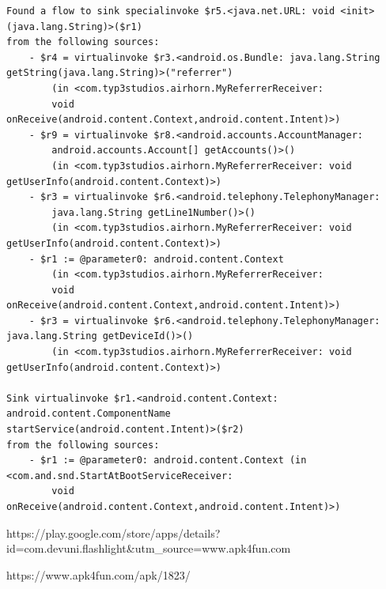 \documentclass[10pt,a4paper]{article}
\begin{document}
\begin{verbatim}
Found a flow to sink specialinvoke $r5.<java.net.URL: void <init>(java.lang.String)>($r1)
from the following sources:
	- $r4 = virtualinvoke $r3.<android.os.Bundle: java.lang.String getString(java.lang.String)>("referrer") 
        (in <com.typ3studios.airhorn.MyReferrerReceiver: 
        void onReceive(android.content.Context,android.content.Intent)>)
	- $r9 = virtualinvoke $r8.<android.accounts.AccountManager: 
        android.accounts.Account[] getAccounts()>() 
        (in <com.typ3studios.airhorn.MyReferrerReceiver: void getUserInfo(android.content.Context)>)
	- $r3 = virtualinvoke $r6.<android.telephony.TelephonyManager: 
        java.lang.String getLine1Number()>() 
        (in <com.typ3studios.airhorn.MyReferrerReceiver: void getUserInfo(android.content.Context)>)
	- $r1 := @parameter0: android.content.Context 
        (in <com.typ3studios.airhorn.MyReferrerReceiver:
        void onReceive(android.content.Context,android.content.Intent)>)
	- $r3 = virtualinvoke $r6.<android.telephony.TelephonyManager: java.lang.String getDeviceId()>() 
        (in <com.typ3studios.airhorn.MyReferrerReceiver: void getUserInfo(android.content.Context)>)

Sink virtualinvoke $r1.<android.content.Context: android.content.ComponentName
startService(android.content.Intent)>($r2)
from the following sources:
	- $r1 := @parameter0: android.content.Context (in <com.and.snd.StartAtBootServiceReceiver: 
        void onReceive(android.content.Context,android.content.Intent)>)
\end{verbatim}

\begin{thebibliography}{9}
  
  https://play.google.com/store/apps/details?id=com.devuni.flashlight\&utm\_source=www.apk4fun.com

  https://www.apk4fun.com/apk/1823/
\end{thebibliography}
\end{document}

